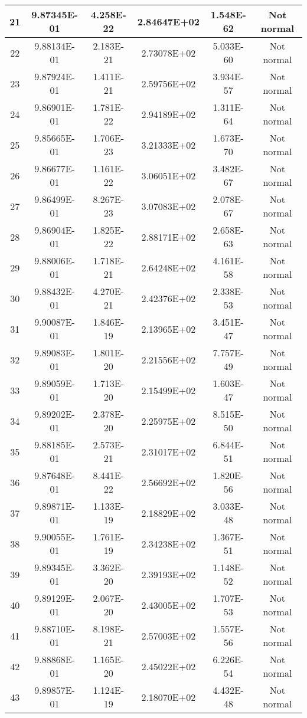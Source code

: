 \begin{table}[h]
\begin{tabular}{|c|c|c|c|c|c|}
		21 & 9.87345E-01 & 4.258E-22 & 2.84647E+02 & 1.548E-62 & Not normal\\\hline
		22 & 9.88134E-01 & 2.183E-21 & 2.73078E+02 & 5.033E-60 & Not normal\\\hline
		23 & 9.87924E-01 & 1.411E-21 & 2.59756E+02 & 3.934E-57 & Not normal\\\hline
		24 & 9.86901E-01 & 1.781E-22 & 2.94189E+02 & 1.311E-64 & Not normal\\\hline
		25 & 9.85665E-01 & 1.706E-23 & 3.21333E+02 & 1.673E-70 & Not normal\\\hline
		26 & 9.86677E-01 & 1.161E-22 & 3.06051E+02 & 3.482E-67 & Not normal\\\hline
		27 & 9.86499E-01 & 8.267E-23 & 3.07083E+02 & 2.078E-67 & Not normal\\\hline
		28 & 9.86904E-01 & 1.825E-22 & 2.88171E+02 & 2.658E-63 & Not normal\\\hline
		29 & 9.88006E-01 & 1.718E-21 & 2.64248E+02 & 4.161E-58 & Not normal\\\hline
		30 & 9.88432E-01 & 4.270E-21 & 2.42376E+02 & 2.338E-53 & Not normal\\\hline
		31 & 9.90087E-01 & 1.846E-19 & 2.13965E+02 & 3.451E-47 & Not normal\\\hline
		32 & 9.89083E-01 & 1.801E-20 & 2.21556E+02 & 7.757E-49 & Not normal\\\hline
		33 & 9.89059E-01 & 1.713E-20 & 2.15499E+02 & 1.603E-47 & Not normal\\\hline
		34 & 9.89202E-01 & 2.378E-20 & 2.25975E+02 & 8.515E-50 & Not normal\\\hline
		35 & 9.88185E-01 & 2.573E-21 & 2.31017E+02 & 6.844E-51 & Not normal\\\hline
		36 & 9.87648E-01 & 8.441E-22 & 2.56692E+02 & 1.820E-56 & Not normal\\\hline
		37 & 9.89871E-01 & 1.133E-19 & 2.18829E+02 & 3.033E-48 & Not normal\\\hline
		38 & 9.90055E-01 & 1.761E-19 & 2.34238E+02 & 1.367E-51 & Not normal\\\hline
		39 & 9.89345E-01 & 3.362E-20 & 2.39193E+02 & 1.148E-52 & Not normal\\\hline
		40 & 9.89129E-01 & 2.067E-20 & 2.43005E+02 & 1.707E-53 & Not normal\\\hline
		41 & 9.88710E-01 & 8.198E-21 & 2.57003E+02 & 1.557E-56 & Not normal\\\hline
		42 & 9.88868E-01 & 1.165E-20 & 2.45022E+02 & 6.226E-54 & Not normal\\\hline
		43 & 9.89857E-01 & 1.124E-19 & 2.18070E+02 & 4.432E-48 & Not normal\\\hline

\end{tabular}
\end{table}
